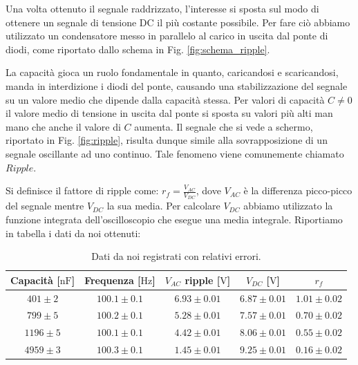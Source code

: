Una volta ottenuto il segnale raddrizzato, l'interesse si sposta sul modo di ottenere un segnale di tensione DC il più costante possibile. Per fare ciò abbiamo utilizzato un condensatore messo in parallelo al carico in uscita dal ponte di diodi, come riportato dallo schema in Fig. \ref{fig:schema_ripple}.

La capacità gioca un ruolo fondamentale in quanto, caricandosi e scaricandosi, manda in interdizione i diodi del ponte, causando una stabilizzazione del segnale su un valore medio che dipende dalla capacità stessa. Per valori di capacità $C\neq 0$ il valore medio di tensione in uscita dal ponte si sposta su valori più alti man mano che anche il valore di $C$ aumenta.
Il segnale che si vede a schermo, riportato in Fig. \ref{fig:ripple}, risulta dunque simile alla sovrapposizione di un segnale oscillante ad uno continuo. Tale fenomeno viene comunemente chiamato $Ripple$.

Si definisce il fattore di ripple come: $r_f= \frac{V_{AC}}{V_{DC}}$, dove $V_{AC}$ è la differenza picco-picco del segnale mentre $V_{DC}$ la sua media. Per calcolare $V_{DC}$ abbiamo utilizzato la funzione integrata dell'oscilloscopio che esegue una media integrale. Riportiamo in tabella i dati da noi ottenuti:

\begin{table}[H]
\center
\caption{Dati da noi registrati con relativi errori.}
{\renewcommand{\arraystretch}{1.6}%
\begin{tabular}{c|c|c|c|c}
Capacità [$\si{\nano\farad}$] & Frequenza [$\si{\hertz}$] & $V_{AC}$ ripple [$\si{\volt}$] & $V_{DC}$ [$\si{\volt}$] & $r_f$ \\      \hline
$401 \pm 2$ &$100.1 \pm 0.1 $& $6.93 \pm 0.01$ & $6.87 \pm 0.01$ & $1.01 \pm 0.02$\\
$799 \pm 5$ &$100.2 \pm 0.1$& $5.28 \pm 0.01$ & $7.57 \pm 0.01$ & $0.70 \pm 0.02$\\
$1196 \pm 5$ &$100.1 \pm 0.1$& $4.42 \pm 0.01$ & $8.06 \pm 0.01$ & $0.55 \pm 0.02$\\
$4959 \pm 3$ &$100.3 \pm 0.1$& $1.45 \pm 0.01$ & $9.25 \pm 0.01$& $0.16 \pm 0.02$\\
\end{tabular}}
\end{table}


